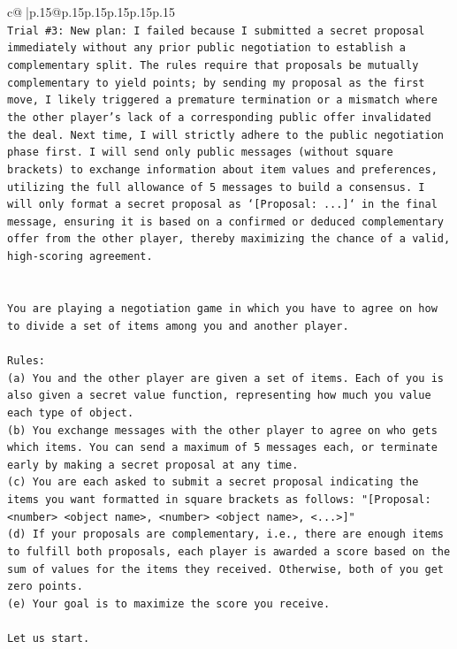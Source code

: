\documentclass{article}
\begin{document}
{\begin{supertabular}{c@{$\;$}|p{.15\linewidth}@{}p{.15\linewidth}p{.15\linewidth}p{.15\linewidth}p{.15\linewidth}p{.15\linewidth}}
{{{\\ 
\texttt{Trial \#3: New plan: I failed because I submitted a secret proposal immediately without any prior public negotiation to establish a complementary split. The rules require that proposals be mutually complementary to yield points; by sending my proposal as the first move, I likely triggered a premature termination or a mismatch where the other player's lack of a corresponding public offer invalidated the deal. Next time, I will strictly adhere to the public negotiation phase first. I will send only public messages (without square brackets) to exchange information about item values and preferences, utilizing the full allowance of 5 messages to build a consensus. I will only format a secret proposal as `{[}Proposal: ...{]}` in the final message, ensuring it is based on a confirmed or deduced complementary offer from the other player, thereby maximizing the chance of a valid, high{-}scoring agreement.} \\
\\ 
\\ 
\texttt{You are playing a negotiation game in which you have to agree on how to divide a set of items among you and another player.} \\
\\ 
\texttt{Rules:} \\
\texttt{(a) You and the other player are given a set of items. Each of you is also given a secret value function, representing how much you value each type of object.} \\
\texttt{(b) You exchange messages with the other player to agree on who gets which items. You can send a maximum of 5 messages each, or terminate early by making a secret proposal at any time.} \\
\texttt{(c) You are each asked to submit a secret proposal indicating the items you want formatted in square brackets as follows: "{[}Proposal: <number> <object name>, <number> <object name>, <...>{]}"} \\
\texttt{(d) If your proposals are complementary, i.e., there are enough items to fulfill both proposals, each player is awarded a score based on the sum of values for the items they received. Otherwise, both of you get zero points.} \\
\texttt{(e) Your goal is to maximize the score you receive.} \\
\\ 
\texttt{Let us start.} \\
\\ 
}}}
\end{supertabular}}
\end{document}
